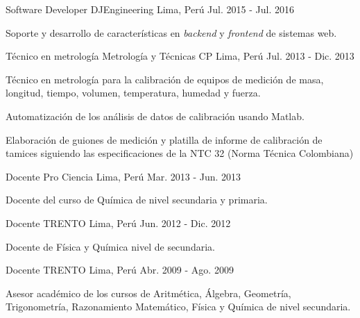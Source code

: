 \begin{cventries}
  \cventry
    {Software Developer} %
    {DJEngineering} %
    {Lima, Perú} %
    {Jul. 2015 - Jul. 2016} %
    {
      \begin{cvitems} %
        \item {Soporte y desarrollo de características en \textit{backend} y \textit{frontend} de
        sistemas web.}
      \end{cvitems}
    }

  \cventry
    {Técnico en metrología} %
    {Metrología y Técnicas CP} %
    {Lima, Perú} %
    {Jul. 2013 - Dic. 2013} %
    {
      \begin{cvitems} %
        \item {Técnico en metrología para la calibración de equipos de medición
        de masa, longitud, tiempo, volumen, temperatura, humedad y fuerza.}
        \item {Automatización de los análisis de datos de calibración usando
        Matlab.}
        \item {Elaboración de guiones de medición y platilla de informe de
        calibración de tamices siguiendo las especificaciones de la NTC 32
        (Norma Técnica Colombiana)}
      \end{cvitems}
    }

  \cventry
    {Docente} %
    {Pro Ciencia} %
    {Lima, Perú} %
    {Mar. 2013 - Jun. 2013} %
    {
      \begin{cvitems} %
        \item {Docente del curso de Química de nivel secundaria y primaria.}
      \end{cvitems}
    }

  \cventry
    {Docente} %
    {TRENTO} %
    {Lima, Perú} %
    {Jun. 2012 - Dic. 2012} %
    {
      \begin{cvitems} %
        \item {Docente de Física y Química nivel de secundaria.}
      \end{cvitems}
    }

  \cventry
    {Docente} %
    {TRENTO} %
    {Lima, Perú} %
    {Abr. 2009 - Ago. 2009} %
    {
      \begin{cvitems} %
        \item {Asesor académico de los cursos de Aritmética, Álgebra, Geometría,
        Trigonometría, Razonamiento Matemático, Física y Química de nivel
        secundaria.}
      \end{cvitems}
    }

\end{cventries}
